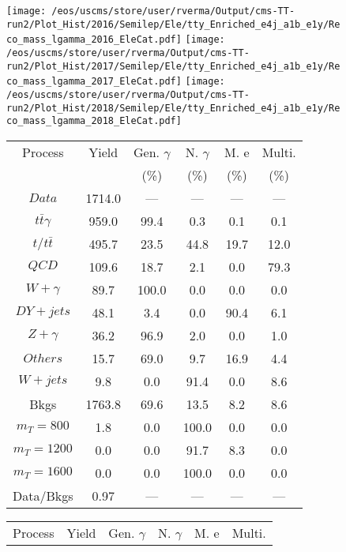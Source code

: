 \begin{figure}
\centering
\texttt{[image: /eos/uscms/store/user/rverma/Output/cms-TT-run2/Plot\_Hist/2016/Semilep/Ele/tty\_Enriched\_e4j\_a1b\_e1y/Reco\_mass\_lgamma\_2016\_EleCat.pdf]}
\texttt{[image: /eos/uscms/store/user/rverma/Output/cms-TT-run2/Plot\_Hist/2017/Semilep/Ele/tty\_Enriched\_e4j\_a1b\_e1y/Reco\_mass\_lgamma\_2017\_EleCat.pdf]}
\texttt{[image: /eos/uscms/store/user/rverma/Output/cms-TT-run2/Plot\_Hist/2018/Semilep/Ele/tty\_Enriched\_e4j\_a1b\_e1y/Reco\_mass\_lgamma\_2018\_EleCat.pdf]}
\begin{minipage}[c]{0.32\textwidth}
\centering
\tiny{
\begin{tabular}{cccccc}
\hline
Process & Yield & Gen. $\gamma$ & N. $\gamma$ & M. e & Multi. \\
 &  & (\%) & (\%) & (\%) & (\%)  \\
\hline
                                                                      $ Data $ &  1714.0 &  --- &  --- &  --- &  ---\\
$ t\bar{t}\gamma $ &  959.0 &  99.4 &  0.3 &  0.1 &  0.1\\
$ t/t\bar{t} $ &  495.7 &  23.5 &  44.8 &  19.7 &  12.0\\
$ QCD $ &  109.6 &  18.7 &  2.1 &  0.0 &  79.3\\
$ W+\gamma $ &  89.7 &  100.0 &  0.0 &  0.0 &  0.0\\
$ DY+jets $ &  48.1 &  3.4 &  0.0 &  90.4 &  6.1\\
$ Z+\gamma $ &  36.2 &  96.9 &  2.0 &  0.0 &  1.0\\
$ Others $ &  15.7 &  69.0 &  9.7 &  16.9 &  4.4\\
$ W+jets $ &  9.8 &  0.0 &  91.4 &  0.0 &  8.6\\
Bkgs &  1763.8 &  69.6 &  13.5 &  8.2 &  8.6\\
$ m_{T} = 800 $ &  1.8 &  0.0 &  100.0 &  0.0 &  0.0\\
$ m_{T} = 1200 $ &  0.0 &  0.0 &  91.7 &  8.3 &  0.0\\
$ m_{T} = 1600 $ &  0.0 &  0.0 &  100.0 &  0.0 &  0.0\\
Data/Bkgs &  0.97 &  --- &  --- &  --- &  ---\\
\hline
\end{tabular}
}
\end{minipage}
\begin{minipage}[c]{0.32\textwidth}
\centering
\tiny{
\begin{tabular}{cccccc}
\hline
Process & Yield & Gen. $\gamma$ & N. $\gamma$ & M. e & Multi. \\

\end{tabular}}
\end{minipage}
\end{figure}

